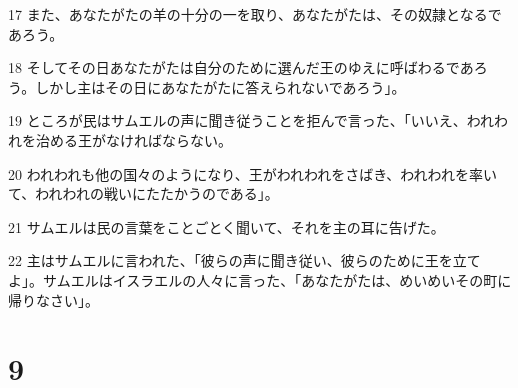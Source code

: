 \par 17 また、あなたがたの羊の十分の一を取り、あなたがたは、その奴隷となるであろう。
\par 18 そしてその日あなたがたは自分のために選んだ王のゆえに呼ばわるであろう。しかし主はその日にあなたがたに答えられないであろう」。
\par 19 ところが民はサムエルの声に聞き従うことを拒んで言った、「いいえ、われわれを治める王がなければならない。
\par 20 われわれも他の国々のようになり、王がわれわれをさばき、われわれを率いて、われわれの戦いにたたかうのである」。
\par 21 サムエルは民の言葉をことごとく聞いて、それを主の耳に告げた。
\par 22 主はサムエルに言われた、「彼らの声に聞き従い、彼らのために王を立てよ」。サムエルはイスラエルの人々に言った、「あなたがたは、めいめいその町に帰りなさい」。

\chapter{9}

